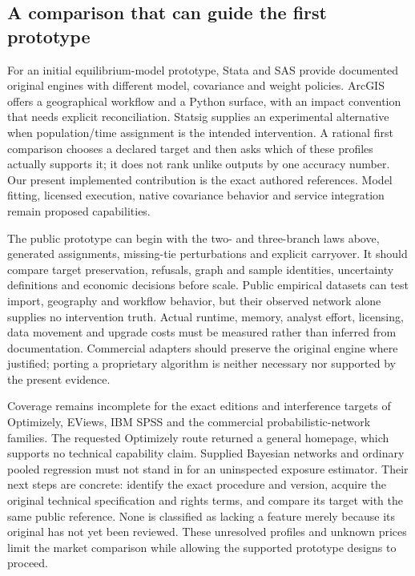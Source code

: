 \subsection{A comparison that can guide the first prototype}
\label{exec20:network-comparison}

For an initial equilibrium-model prototype, Stata and SAS provide documented
original engines with different model, covariance and weight policies. ArcGIS
offers a geographical workflow and a Python surface, with an impact convention
that needs explicit reconciliation. Statsig supplies an experimental alternative
when population/time assignment is the intended intervention. A rational first
comparison chooses a declared target and then asks which of these profiles
actually supports it; it does not rank unlike outputs by one accuracy number.
Our present implemented contribution is the exact authored references. Model
fitting, licensed execution, native covariance behavior and service integration
remain proposed capabilities.

The public prototype can begin with the two- and three-branch laws above,
generated assignments, missing-tie perturbations and explicit carryover. It
should compare target preservation, refusals, graph and sample identities,
uncertainty definitions and economic decisions before scale. Public empirical
datasets can test import, geography and workflow behavior, but their observed
network alone supplies no intervention truth. Actual runtime, memory, analyst
effort, licensing, data movement and upgrade costs must be measured rather than
inferred from documentation. Commercial adapters should preserve the original
engine where justified; porting a proprietary algorithm is neither necessary
nor supported by the present evidence.

Coverage remains incomplete for the exact editions and interference targets of
Optimizely, EViews, IBM SPSS and the commercial probabilistic-network families.
The requested Optimizely route returned a general homepage, which supports no
technical capability claim. Supplied Bayesian networks and ordinary pooled
regression must not stand in for an uninspected exposure estimator. Their next
steps are concrete: identify the exact procedure and version, acquire the
original technical specification and rights terms, and compare its target with
the same public reference. None is classified as lacking a feature merely
because its original has not yet been reviewed. These unresolved profiles and
unknown prices limit the market comparison while allowing the supported
prototype designs to proceed.


